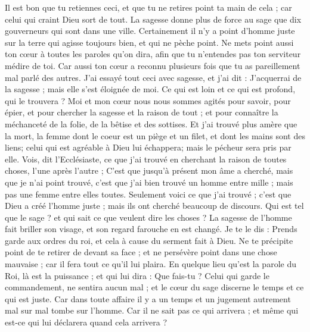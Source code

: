 \begin{multicols}{2}
Il est bon que tu retiennes ceci, et que tu ne retires point ta main de cela ; car celui qui craint Dieu sort de tout.
La sagesse donne plus de force au sage que dix gouverneurs qui sont dans une ville.
Certainement il n'y a point d'homme juste sur la terre qui agisse toujours bien, et qui ne pèche point.
Ne mets point aussi ton cœur à toutes les paroles qu'on dira, afin que tu n'entendes pas ton serviteur médire de toi. 
Car aussi ton cœur a reconnu plusieurs fois que tu as pareillement mal parlé des autres. 
J'ai essayé tout ceci avec sagesse, et j'ai dit : J'acquerrai de la sagesse ; mais elle s'est éloignée de moi. 
Ce qui est loin et ce qui est profond, qui le trouvera ?
Moi et mon cœur nous nous sommes agités pour savoir, pour épier, et pour chercher la sagesse et la raison de tout ; et pour connaître la méchanceté de la folie, de la bêtise et des sottises. 
Et j'ai trouvé plus amère que la mort, la femme dont le coeur est un piège et un filet, et dont les mains sont des liens; celui qui est agréable à Dieu lui échappera; mais le pécheur sera pris par elle.
Vois, dit l'Ecclésiaste, ce que j'ai trouvé en cherchant la raison de toutes choses, l'une après l'autre ;
C'est que jusqu'à présent mon âme a cherché, mais que je n'ai point trouvé, c'est que j'ai bien trouvé un homme entre mille ; mais pas une femme entre elles toutes. 
Seulement voici ce que j'ai trouvé ; c'est que Dieu a créé l'homme juste ; mais ils ont cherché beaucoup de discours.
\VerseOne{}Qui est tel que le sage ? et qui sait ce que veulent dire les choses ? La sagesse de l'homme fait briller son visage, et son regard farouche en est changé.
Je te le dis : Prends garde aux ordres du roi, et cela à cause du serment fait à Dieu.
Ne te précipite point de te retirer de devant sa face ; et ne persévère point dans une chose mauvaise ; car il fera tout ce qu'il lui plaira. 
En quelque lieu qu'est la parole du Roi, là est la puissance ; et qui lui dira : Que fais-tu ? 
Celui qui garde le commandement, ne sentira aucun mal ; et le cœur du sage discerne le temps et ce qui est juste. 
Car dans toute affaire il y a un temps et un jugement autrement mal sur mal tombe sur l'homme. 
Car il ne sait pas ce qui arrivera ; et même qui est-ce qui lui déclarera quand cela arrivera ? 

\end{multicols}
